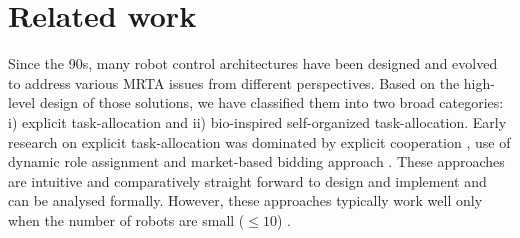 \documentclass[journal]{IEEEtran}
\begin{document}
\section{Related work}
\label{sec:rw}
Since the 90s, many robot control architectures have been designed and evolved to address various MRTA issues from different perspectives. Based on the high-level design of those solutions, we have classified them into two broad categories: i) explicit task-allocation and ii) bio-inspired self-organized task-allocation. %
Early research on explicit task-allocation was dominated by explicit cooperation \cite{Parker1998}, use of dynamic role assignment \cite{Chaimowicz2002} and market-based bidding approach \cite{Zlot+2002}. %
These approaches are intuitive and comparatively straight forward to design and implement and can be analysed formally. However, these approaches typically work well only when the number of robots are small ($\leq 10$) \cite{Lerman+2006}.
\end{document}
